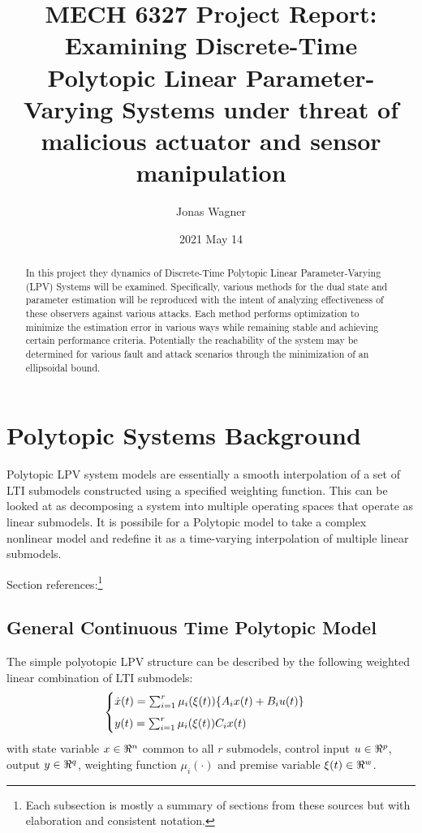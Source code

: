 \documentclass[]{ieeetran}
\title{MECH 6327 Project Report:\\
Examining Discrete-Time Polytopic Linear Parameter-Varying Systems under threat of malicious actuator and sensor manipulation}
\author{Jonas Wagner}
\date{2021 May 14}
\begin{document}
\maketitle

\begin{abstract}
	In this project they dynamics of Discrete-Time Polytopic Linear Parameter-Varying (LPV) Systems will be examined. Specifically, various methods for the dual state and parameter estimation will be reproduced with the intent of analyzing effectiveness of these observers against various attacks. Each method performs optimization to minimize the estimation error in various ways while remaining stable and achieving certain performance criteria. Potentially the reachability of the system may be determined for various fault and attack scenarios through the minimization of an ellipsoidal bound.
\end{abstract}


%
%
\section{Polytopic Systems Background}
Polytopic LPV system models are essentially a smooth interpolation of a set of LTI submodels constructed using a specified weighting function. This can be looked at as decomposing a system into multiple operating spaces that operate as linear submodels. It is possibile for a Polytopic model to take a complex nonlinear model and redefine it as a time-varying interpolation of multiple linear submodels.

Section references:\footnote{Each subsection is mostly a summary of sections from these sources but with elaboration and consistent notation.}
\cite{beelen2017joint} \cite{ORJUELA2019295} \cite{orjuela2013nonlinear}\\

\subsection{General Continuous Time Polytopic Model} 
The simple polyotopic LPV structure can be described by the following weighted linear combination of LTI submodels:
\begin{equation}\label{eq:CT_poly_sys_def}
	\begin{cases}
		\dot{x}(t) 	= \sum_{i=1}^r \mu_i(\xi(t))\{A_i x(t) + B_i u(t)\}  \vspace{5pt} \\ 
		y(t)		= \sum_{i=1}^r \mu_i(\xi(t)) C_i x(t)
	\end{cases}
\end{equation}
with state variable $x \in \real^n$ common to all $r$ submodels, control input $u \in \real^p$, output $y \in \real^q$, weighting function $\mu_i(\cdot)$ and premise variable $\xi(t) \in \real^{w}$. 
\end{document}
